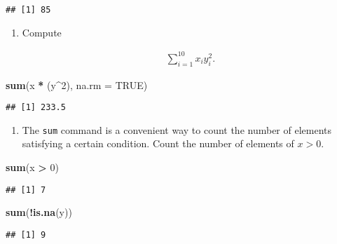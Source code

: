 \documentclass[]{article}
\newenvironment{Shaded}{\begin{snugshade}}{\end{snugshade}}
\newcommand{\KeywordTok}[1]{\textcolor[rgb]{0.13,0.29,0.53}{\textbf{#1}}}
\newcommand{\DataTypeTok}[1]{\textcolor[rgb]{0.13,0.29,0.53}{#1}}
\newcommand{\DecValTok}[1]{\textcolor[rgb]{0.00,0.00,0.81}{#1}}
\newcommand{\StringTok}[1]{\textcolor[rgb]{0.31,0.60,0.02}{#1}}
\newcommand{\OtherTok}[1]{\textcolor[rgb]{0.56,0.35,0.01}{#1}}
\newcommand{\OperatorTok}[1]{\textcolor[rgb]{0.81,0.36,0.00}{\textbf{#1}}}
\newcommand{\NormalTok}[1]{#1}
\providecommand{\tightlist}{%
  \setlength{\itemsep}{0pt}\setlength{\parskip}{0pt}}
\begin{document}
\begin{verbatim}
## [1] 85
\end{verbatim}

\begin{enumerate}
\def\labelenumi{\arabic{enumi}.}
\setcounter{enumi}{4}
\tightlist
\item
  Compute

  \begin{align*}
  \sum_{i=1}^{10}x_{i}y_{i}^{2}.
  \end{align*}
\end{enumerate}

\begin{Shaded}
\begin{Highlighting}[]
\KeywordTok{sum}\NormalTok{(x }\OperatorTok{*}\StringTok{ }\NormalTok{(y}\OperatorTok{^}\DecValTok{2}\NormalTok{), }\DataTypeTok{na.rm =} \OtherTok{TRUE}\NormalTok{)}
\end{Highlighting}
\end{Shaded}

\begin{verbatim}
## [1] 233.5
\end{verbatim}

\begin{enumerate}
\def\labelenumi{\arabic{enumi}.}
\setcounter{enumi}{5}
\tightlist
\item
  The \texttt{sum} command is a convenient way to count the number of
  elements satisfying a certain condition. Count the number of elements
  of \(x>0\).
\end{enumerate}

\begin{Shaded}
\begin{Highlighting}[]
\KeywordTok{sum}\NormalTok{(x }\OperatorTok{>}\StringTok{ }\DecValTok{0}\NormalTok{)}
\end{Highlighting}
\end{Shaded}

\begin{verbatim}
## [1] 7
\end{verbatim}

\begin{Shaded}
\begin{Highlighting}[]
\KeywordTok{sum}\NormalTok{(}\OperatorTok{!}\KeywordTok{is.na}\NormalTok{(y))}
\end{Highlighting}
\end{Shaded}

\begin{verbatim}
## [1] 9
\end{verbatim}
\end{document}
